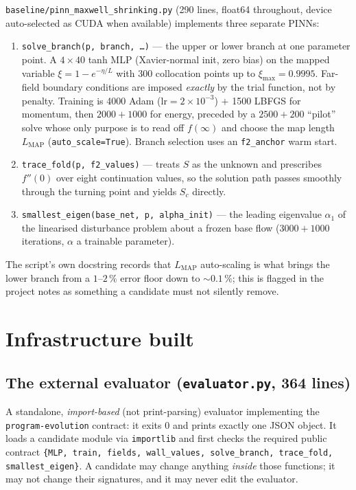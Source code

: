 \documentclass[11pt,a4paper]{article}
\newcommand{\code}[1]{\texttt{\small #1}}
\newcommand{\pct}{\,\%}
\begin{document}
\code{baseline/pinn\_maxwell\_shrinking.py} (290 lines, float64 throughout, device
auto-selected as CUDA when available) implements three separate PINNs:

\begin{enumerate}[leftmargin=1.4em,itemsep=2pt]
  \item \code{solve\_branch(p, branch, \ldots)} --- the upper or lower branch at one
        parameter point. A $4\times40$ tanh MLP (Xavier-normal init, zero bias) on the
        mapped variable $\xi = 1-e^{-\eta/L}$ with 300 collocation points up to
        $\xi_{\max}=0.9995$. Far-field boundary conditions are imposed \emph{exactly} by
        the trial function, not by penalty. Training is 4000 Adam
        ($\mathrm{lr}=2\times10^{-3}$) $+$ 1500 LBFGS for momentum, then
        $2000+1000$ for energy, preceded by a $2500+200$ ``pilot'' solve whose only purpose
        is to read off $f(\infty)$ and choose the map length $L_{\mathrm{MAP}}$
        (\code{auto\_scale=True}). Branch selection uses an \code{f2\_anchor} warm start.
  \item \code{trace\_fold(p, f2\_values)} --- treats $S$ as the unknown and prescribes
        $f''(0)$ over eight continuation values, so the solution path passes smoothly
        through the turning point and yields $S_c$ directly.
  \item \code{smallest\_eigen(base\_net, p, alpha\_init)} --- the leading eigenvalue
        $\alpha_1$ of the linearised disturbance problem about a frozen base flow
        ($3000+1000$ iterations, $\alpha$ a trainable parameter).
\end{enumerate}

\noindent The script's own docstring records that $L_{\mathrm{MAP}}$ auto-scaling is what
brings the lower branch from a $1$--$2\pct$ error floor down to ${\sim}0.1\pct$; this is
flagged in the project notes as something a candidate must not silently remove.

\section{Infrastructure built}

\subsection{The external evaluator (\code{evaluator.py}, 364 lines)}
A standalone, \emph{import-based} (not print-parsing) evaluator implementing the
\code{program-evolution} contract: it exits 0 and prints exactly one JSON object. It loads
a candidate module via \code{importlib} and first checks the required public contract
\code{\{MLP, train, fields, wall\_values, solve\_branch, trace\_fold, smallest\_eigen\}}.
A candidate may change anything \emph{inside} those functions; it may not change their
signatures, and it may never edit the evaluator.
\end{document}
